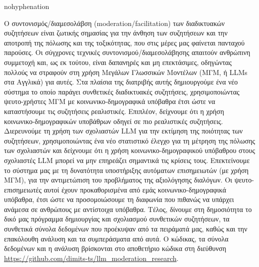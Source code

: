 \begin{hyphenrules}{nohyphenation}
	\sloppy
	
	Ο συντονισμός/διαμεσολάβση (moderation/facilitation) των διαδικτυακών συζητήσεων είναι ζωτικής σημασίας για την άνθηση των συζητήσεων και την αποτροπή της πόλωσης και της τοξικότητας, που στις μέρες μας φαίνεται πανταχού παρούσες. Οι σύγχρονες τεχνικές συντονισμού/διαμεσολάβησης απαιτούν ανθρώπινη συμμετοχή και, ως εκ τούτου, είναι δαπανηρές και μη επεκτάσιμες, οδηγώντας πολλούς να στραφούν στη χρήση Μεγάλων Γλωσσικών Μοντέλων (ΜΓΜ, ή LLMs στα Αγγλικά) για αυτές. Στα πλαίσια της διατριβής αυτής δημιουργούμε ένα νέο σύστημα το οποίο παράγει συνθετικές διαδικτυακές συζητήσεις, χρησιμοποιώντας ψευτο-χρήστες ΜΓΜ με κοινωνικο-δημογραφικά υπόβαθρα έτσι ώστε να καταστήσουμε τις συζητήσεις ρεαλιστικές. Επιπλέον, δείχνουμε ότι η χρήση κοινωνικο-δημογραφικών υποβάθρων οδηγεί σε πιο ρεαλιστικές συζητήσεις. Διερευνούμε τη χρήση των σχολιαστών LLM για την εκτίμηση της ποιότητας των συζητήσεων, χρησιμοποιώντας ένα νέο στατιστικό έλεγχο για τη μέτρηση της πόλωσης των σχολιαστών και δείχνουμε ότι η χρήση κοινωνικο-δημογραφικού υπόβαθρου στους σχολιαστές LLM μπορεί να μην επηρεάζει σημαντικά τις κρίσεις τους. Επεκτείνουμε το σύστημα μας με τη δυνατότητα υποστήριξης αυτόματων επισημειωτών (με χρήση ΜΓΜ), για την αντιμετώπιση του προβλήματος της αξιολόγησης διαλόγων. Οι ψευτο-επισημειωτές αυτοί έχουν προκαθορισμένα από εμάς κοινωνικο-δημογραφικά υπόβαθρα, έτσι ώστε να προσομοιώσουμε τη διαφωνία που πιθανώς να υπάρχει ανάμεσα σε ανθρώπους με αντίστοιχα υπόβαθρα. Τέλος, δίνουμε στη δημοσιότητα το δικό μας πρόγραμμα δημιουργίας και σχολιασμού συνθετικών συζητήσεων, τα συνθετικά σύνολα δεδομένων που προέκυψαν από τα πειράματά μας, καθώς και την επακόλουθη ανάλυση και τα συμπεράσματα από αυτά. Ο κώδικας, τα σύνολα δεδομένων και η ανάλυση βρίσκονται στο αποθετήριο κώδικα στη διεύθυνση \url{https://github.com/dimits-ts/llm_moderation_research}.
	
	\fussy
\end{hyphenrules}